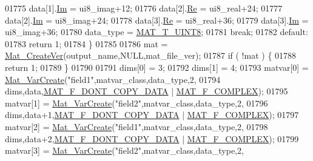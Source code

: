 \begin{DoxyCode}
{{{{{01775             data[1].\hyperlink{group___m_a_t_a7182d10b0d3598415887376065440946}{Im} = ui8\_imag+12;
01776             data[2].\hyperlink{group___m_a_t_a484a93607508adac2bce53a0252e0325}{Re} = ui8\_real+24;
01777             data[2].\hyperlink{group___m_a_t_a7182d10b0d3598415887376065440946}{Im} = ui8\_imag+24;
01778             data[3].\hyperlink{group___m_a_t_a484a93607508adac2bce53a0252e0325}{Re} = ui8\_real+36;
01779             data[3].\hyperlink{group___m_a_t_a7182d10b0d3598415887376065440946}{Im} = ui8\_imag+36;
01780             data\_type = \hyperlink{group___m_a_t_ggacf7b3b879282b7ab3a51190e49bf3453a01c1bd7db68f90552862eb5d311be408}{MAT\_T\_UINT8};
01781             \textcolor{keywordflow}{break};
01782         \textcolor{keywordflow}{default}:
01783             \textcolor{keywordflow}{return} 1;
01784     \}
01785 
01786     mat = \hyperlink{group___m_a_t_ga22d404f203af7869c841400e7ad247cf}{Mat\_CreateVer}(output\_name,NULL,mat\_file\_ver);
01787     \textcolor{keywordflow}{if} ( !mat ) \{
01788         \textcolor{keywordflow}{return} 1;
01789     \}
01790 
01791     dims[0] = 3;
01792     dims[1] = 4;
01793     matvar[0] = \hyperlink{group___m_a_t_ga1c54a84bb4d810c6fccdb8869489eac4}{Mat\_VarCreate}(\textcolor{stringliteral}{"field1"},matvar\_class,data\_type,2,
01794                    dims,data,\hyperlink{group___m_a_t_ggab9d6ef9e3ddca78a317b173f01d53fbba762244499f52eb35e7b53fb79a1f2889}{MAT\_F\_DONT\_COPY\_DATA} | 
      \hyperlink{group___m_a_t_ggab9d6ef9e3ddca78a317b173f01d53fbbacd7b091a11184aad7fc6078c04470780}{MAT\_F\_COMPLEX});
01795     matvar[1] = \hyperlink{group___m_a_t_ga1c54a84bb4d810c6fccdb8869489eac4}{Mat\_VarCreate}(\textcolor{stringliteral}{"field2"},matvar\_class,data\_type,2,
01796                    dims,data+1,\hyperlink{group___m_a_t_ggab9d6ef9e3ddca78a317b173f01d53fbba762244499f52eb35e7b53fb79a1f2889}{MAT\_F\_DONT\_COPY\_DATA} | 
      \hyperlink{group___m_a_t_ggab9d6ef9e3ddca78a317b173f01d53fbbacd7b091a11184aad7fc6078c04470780}{MAT\_F\_COMPLEX});
01797     matvar[2] = \hyperlink{group___m_a_t_ga1c54a84bb4d810c6fccdb8869489eac4}{Mat\_VarCreate}(\textcolor{stringliteral}{"field1"},matvar\_class,data\_type,2,
01798                    dims,data+2,\hyperlink{group___m_a_t_ggab9d6ef9e3ddca78a317b173f01d53fbba762244499f52eb35e7b53fb79a1f2889}{MAT\_F\_DONT\_COPY\_DATA} | 
      \hyperlink{group___m_a_t_ggab9d6ef9e3ddca78a317b173f01d53fbbacd7b091a11184aad7fc6078c04470780}{MAT\_F\_COMPLEX});
01799     matvar[3] = \hyperlink{group___m_a_t_ga1c54a84bb4d810c6fccdb8869489eac4}{Mat\_VarCreate}(\textcolor{stringliteral}{"field2"},matvar\_class,data\_type,2,
}}}}}
\end{DoxyCode}
